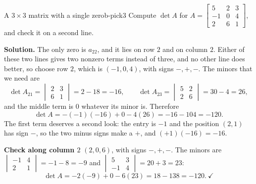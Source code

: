 \documentclass[11pt]{article}
\begin{document}
\begin{exmp}{A $3\times3$ matrix with a single zero}{b-pick3}
Compute $\det A$ for $A=\begin{bmatrix}5&2&3\\-1&0&4\\2&6&1\end{bmatrix}$, and check it on a second line.

\textbf{Solution.} The only zero is $a_{22}$, and it lies on row $2$ and on column $2$. Either of these two lines gives two nonzero terms instead of three, and no other line does better, so choose row $2$, which is $(-1,0,4)$, with signs $-,+,-$. The minors that we need are
\[
\det A_{21}=\begin{vmatrix}2&3\\6&1\end{vmatrix}=2-18=-16,\qquad \det A_{23}=\begin{vmatrix}5&2\\2&6\end{vmatrix}=30-4=26,
\]
and the middle term is $0$ whatever its minor is. Therefore
\[
\det A=-(-1)(-16)+0-4(26)=-16-104=-120.
\]
The first term deserves a second look: the entry is $-1$ and the position $(2,1)$ has sign $-$, so the two minus signs make a $+$, and $(+1)(-16)=-16$.

\textbf{Check along column $2$} $(2,0,6)$, with signs $-,+,-$. The minors are $\begin{vmatrix}-1&4\\2&1\end{vmatrix}=-1-8=-9$ and $\begin{vmatrix}5&3\\-1&4\end{vmatrix}=20+3=23$:
\[
\det A=-2(-9)+0-6(23)=18-138=-120.\ \checkmark
\]
\end{exmp}
\end{document}
